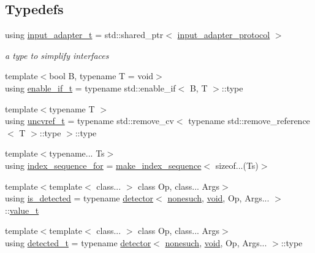 \subsection*{Typedefs}
\begin{DoxyCompactItemize}
\item 
using \hyperlink{namespacenlohmann_1_1detail_ae132f8cd5bb24c5e9b40ad0eafedf1c2}{input\+\_\+adapter\+\_\+t} = std\+::shared\+\_\+ptr$<$ \hyperlink{structnlohmann_1_1detail_1_1input__adapter__protocol}{input\+\_\+adapter\+\_\+protocol} $>$
\begin{DoxyCompactList}\small\item\em a type to simplify interfaces \end{DoxyCompactList}\item 
{\footnotesize template$<$bool B, typename T  = void$>$ }\\using \hyperlink{namespacenlohmann_1_1detail_a02bcbc878bee413f25b985ada771aa9c}{enable\+\_\+if\+\_\+t} = typename std\+::enable\+\_\+if$<$ B, T $>$\+::type
\item 
{\footnotesize template$<$typename T $>$ }\\using \hyperlink{namespacenlohmann_1_1detail_a53a082eedad9f4729fcd8fed552a21f7}{uncvref\+\_\+t} = typename std\+::remove\+\_\+cv$<$ typename std\+::remove\+\_\+reference$<$ T $>$\+::type $>$\+::type
\item 
{\footnotesize template$<$typename... Ts$>$ }\\using \hyperlink{namespacenlohmann_1_1detail_a24800493c6ec02ce033dcbb47b7fd28e}{index\+\_\+sequence\+\_\+for} = \hyperlink{structnlohmann_1_1detail_1_1make__index__sequence}{make\+\_\+index\+\_\+sequence}$<$ sizeof...(Ts)$>$
\item 
{\footnotesize template$<$template$<$ class... $>$ class Op, class... Args$>$ }\\using \hyperlink{namespacenlohmann_1_1detail_a9135fcf616d6ac6e231a86e0a055ac44}{is\+\_\+detected} = typename \hyperlink{structnlohmann_1_1detail_1_1detector}{detector}$<$ \hyperlink{structnlohmann_1_1detail_1_1nonesuch}{nonesuch}, \hyperlink{namespacenlohmann_1_1detail_a59fca69799f6b9e366710cb9043aa77d}{void}, Op, Args... $>$\+::\hyperlink{namespacenlohmann_1_1detail_a1ed8fc6239da25abcaf681d30ace4985}{value\+\_\+t}
\item 
{\footnotesize template$<$template$<$ class... $>$ class Op, class... Args$>$ }\\using \hyperlink{namespacenlohmann_1_1detail_a37e97a32d0b94ce5f745427e4e40204d}{detected\+\_\+t} = typename \hyperlink{structnlohmann_1_1detail_1_1detector}{detector}$<$ \hyperlink{structnlohmann_1_1detail_1_1nonesuch}{nonesuch}, \hyperlink{namespacenlohmann_1_1detail_a59fca69799f6b9e366710cb9043aa77d}{void}, Op, Args... $>$\+::type

\end{DoxyCompactItemize}
